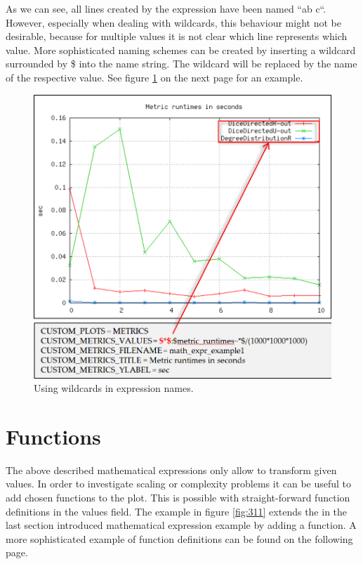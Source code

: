 As we can see, all lines created by the expression have been named “ab c“. However, especially when dealing with wildcards, this behaviour might not be desirable, because for multiple values it is not clear which line represents which value. More sophisticated naming schemes can be created by inserting a wildcard surrounded by \$ into the name string. The wildcard will be replaced by the name of the respective value. See figure \ref{fig:310} on the next page for an example.

\begin{figure} [h]
\centering
\includegraphics [scale=0.5] {images/310}
\caption{Using wildcards in expression names.}
\label{fig:310}
\end{figure}

\section{Functions}
The above described mathematical expressions only allow to transform given values. In order to investigate scaling or complexity problems it can be useful to add chosen functions to the plot. This is possible with straight-forward function definitions in the values field. The example in figure \ref{fig:311} extends the in the last section introduced mathematical expression example by adding a function. A more sophisticated example of function definitions can be found on the following page.

